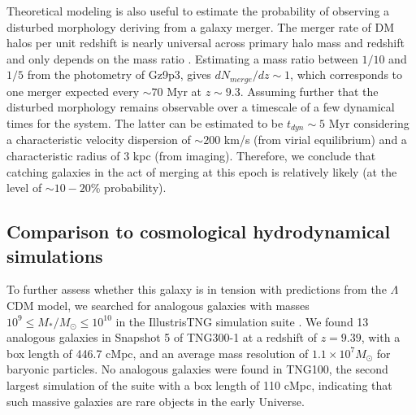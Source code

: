 \documentclass[sn-mathphys]{sn-jnl}%
\theoremstyle{thmstyleone}%
\theoremstyle{thmstyletwo}%
\theoremstyle{thmstylethree}%
\begin{document}
Theoretical modeling is also useful to estimate the probability of observing a disturbed morphology deriving from a galaxy merger. The merger rate of DM halos per unit redshift is nearly universal across primary halo mass and redshift and only depends on the mass ratio \citep{Fakhouri2008}. Estimating a mass ratio between $1/10$ and $1/5$ from the photometry of Gz9p3, \cite{Fakhouri2008} gives $dN_{merge}/dz\sim 1$, which corresponds  to one merger expected every $\sim 70$ Myr at $z\sim 9.3$. Assuming further that the disturbed morphology remains observable over a timescale of a few dynamical times for the system. The latter can be estimated to be $t_{dyn}\sim 5$ Myr considering a characteristic velocity dispersion of $\sim 200$ km/s (from virial equilibrium) and a characteristic radius of $3$ kpc (from imaging). Therefore, we conclude that catching galaxies in the act of merging at this epoch is relatively likely (at the level of $\sim 10-20$\% probability). 

\subsection{Comparison to cosmological hydrodynamical simulations} \label{sec:simulations}

To further assess whether this galaxy is in tension with predictions from the $\Lambda$CDM model, we searched for analogous galaxies with masses $10^9 \leq M_* / M_\odot \leq 10^{10}$ in the IllustrisTNG simulation suite \citep{TNG1, TNG2, TNG3, TNG4, TNG5}. We found 13 analogous galaxies in Snapshot 5 of TNG300-1 at a redshift of $z=9.39$, with a box length of 446.7 cMpc, 
and an average mass resolution of $1.1 \times 10^7 M_\odot$ for baryonic particles. No analogous galaxies were found in TNG100, the second largest simulation of the suite with a box length of 110 cMpc, indicating that such massive galaxies are rare objects in the early Universe.
\end{document}
